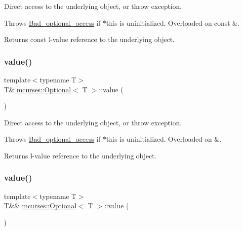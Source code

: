 Direct access to the underlying object, or throw exception. 

Throws \hyperlink{classmcurses_1_1Bad__optional__access}{Bad\+\_\+optional\+\_\+access} if $\ast$this is uninitialized. Overloaded on const \&. \begin{DoxyReturn}{Returns}
const l-\/value reference to the underlying object. 
\end{DoxyReturn}
\hypertarget{classmcurses_1_1Optional_ab94cd795bbc0dc263d61a2b49cd79084}{}\label{classmcurses_1_1Optional_ab94cd795bbc0dc263d61a2b49cd79084} 
\subsubsection{\texorpdfstring{value()}{value()}\hspace{0.1cm}{\footnotesize\ttfamily [2/3]}}
{\footnotesize\ttfamily template$<$typename T$>$ \\
T\& \hyperlink{classmcurses_1_1Optional}{mcurses\+::\+Optional}$<$ T $>$\+::value (\begin{DoxyParamCaption}{ }\end{DoxyParamCaption})\hspace{0.3cm}{\ttfamily [inline]}}



Direct access to the underlying object, or throw exception. 

Throws \hyperlink{classmcurses_1_1Bad__optional__access}{Bad\+\_\+optional\+\_\+access} if $\ast$this is uninitialized. Overloaded on \&. \begin{DoxyReturn}{Returns}
l-\/value reference to the underlying object. 
\end{DoxyReturn}
\hypertarget{classmcurses_1_1Optional_a0d09d596f54af6693bedcf5dc12e6d3b}{}\label{classmcurses_1_1Optional_a0d09d596f54af6693bedcf5dc12e6d3b} 
\subsubsection{\texorpdfstring{value()}{value()}\hspace{0.1cm}{\footnotesize\ttfamily [3/3]}}
{\footnotesize\ttfamily template$<$typename T$>$ \\
T\&\& \hyperlink{classmcurses_1_1Optional}{mcurses\+::\+Optional}$<$ T $>$\+::value (\begin{DoxyParamCaption}{ }\end{DoxyParamCaption})\hspace{0.3cm}{\ttfamily [inline]}}



